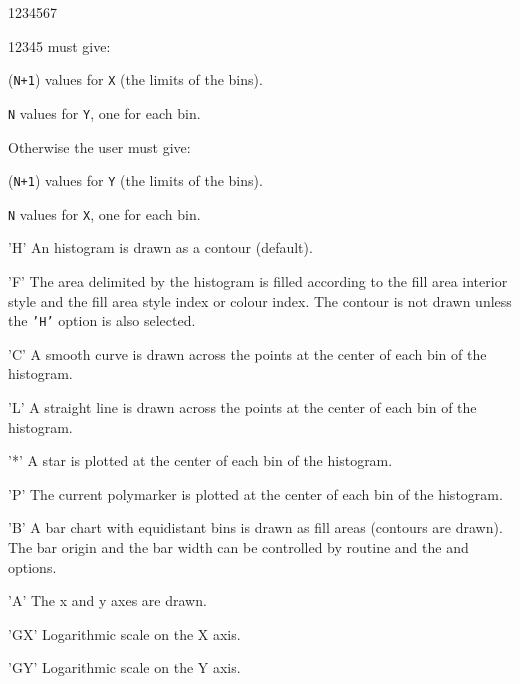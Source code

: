 \begin{DLtt}{1234567}
\begin{DLtt}{12345}
               must give:
   \begin{UL}
      \item ({\tt N+1}) values for {\tt X} (the limits of the bins).
      \item {\tt N} values for {\tt Y}, one for each bin.
   \end{UL}
   Otherwise the user must give:
   \begin{UL}
      \item ({\tt N+1}) values for {\tt Y} (the limits of the bins).
      \item {\tt N} values for {\tt X}, one for each bin.
   \end{UL}
   \item['H'] An histogram is drawn as a contour (default).
   \item['F'] The area delimited by the histogram is filled according to the
              fill area interior style and the fill area style index or colour
              index. The contour is not drawn unless the {\tt 'H'} option is
              also selected.
   \item['C'] A smooth curve is drawn across the points at the center of each
              bin of the histogram.
   \item['L'] A straight line is drawn across the points at the center of
              each bin of the histogram.
   \item['*'] A star is plotted at the center of each bin of the histogram.
   \item['P'] The current polymarker is plotted at the center of each bin
              of the histogram.
   \item['B'] A bar chart with equidistant bins is drawn as fill areas
              (contours are drawn). The bar origin and the bar
              width can be controlled by routine  and the
               and  options.
   \item['A'] The x and y axes are drawn.
   \item['GX'] Logarithmic scale on the X axis.
   \item['GY'] Logarithmic scale on the Y axis.
\end{DLtt}
\end{DLtt}

